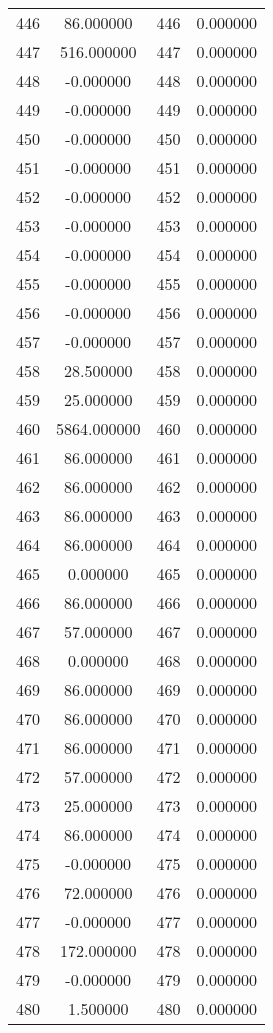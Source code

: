 \documentclass[12pt]{article}
\begin{document}
\begin{longtable}{@{}cccc@{}}
446 & 86.000000 & 446 & 0.000000 \\
447 & 516.000000 & 447 & 0.000000 \\
448 & -0.000000 & 448 & 0.000000 \\
449 & -0.000000 & 449 & 0.000000 \\
450 & -0.000000 & 450 & 0.000000 \\
451 & -0.000000 & 451 & 0.000000 \\
452 & -0.000000 & 452 & 0.000000 \\
453 & -0.000000 & 453 & 0.000000 \\
454 & -0.000000 & 454 & 0.000000 \\
455 & -0.000000 & 455 & 0.000000 \\
456 & -0.000000 & 456 & 0.000000 \\
457 & -0.000000 & 457 & 0.000000 \\
458 & 28.500000 & 458 & 0.000000 \\
459 & 25.000000 & 459 & 0.000000 \\
460 & 5864.000000 & 460 & 0.000000 \\
461 & 86.000000 & 461 & 0.000000 \\
462 & 86.000000 & 462 & 0.000000 \\
463 & 86.000000 & 463 & 0.000000 \\
464 & 86.000000 & 464 & 0.000000 \\
465 & 0.000000 & 465 & 0.000000 \\
466 & 86.000000 & 466 & 0.000000 \\
467 & 57.000000 & 467 & 0.000000 \\
468 & 0.000000 & 468 & 0.000000 \\
469 & 86.000000 & 469 & 0.000000 \\
470 & 86.000000 & 470 & 0.000000 \\
471 & 86.000000 & 471 & 0.000000 \\
472 & 57.000000 & 472 & 0.000000 \\
473 & 25.000000 & 473 & 0.000000 \\
474 & 86.000000 & 474 & 0.000000 \\
475 & -0.000000 & 475 & 0.000000 \\
476 & 72.000000 & 476 & 0.000000 \\
477 & -0.000000 & 477 & 0.000000 \\
478 & 172.000000 & 478 & 0.000000 \\
479 & -0.000000 & 479 & 0.000000 \\
480 & 1.500000 & 480 & 0.000000 \\

\end{longtable}
\end{document}
